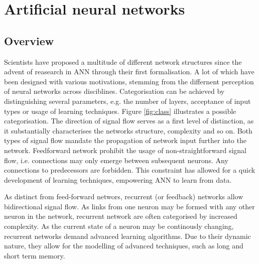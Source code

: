 \documentclass[10pt,a4paper,DIV=11]{scrreprt}
\begin{document}
\chapter{Artificial neural networks}
\section{Overview}

Scientists have proposed a multitude of different network structures since the advent of reasearch in ANN through their first formalisation. A lot of which have been designed with various motivations, stemming from the differnent perception of neural networks across disciblines. Categorisation can be achieved by distinguishing several parameters, e.g. the number of layers, acceptance of input types or usage of learning techniques. Figure \ref{fig:class} illustrates a possible categorisation\cite{NNGER}. The direction of signal flow serves as a first level of distinction, as it substantially characterises the networks structure, complexity and so on. Both types of signal flow mandate the propagation of network input further into the network. Feedforward network prohibit the usage of non-straightforward signal flow, i.e. connections may only emerge between subsequent neurons. Any connections to predecessors are forbidden. This constraint has allowed for a quick development of learning techniques, empowering ANN to learn from data. 

As distinct from feed-forward networs, recurrent (or feedback) networks allow bidirectional signal flow. As links from one neuron may be formed with any other neuron in the network, recurrent network are often categorised by increased complexity. As the current state of a neuron may be continously changing, recurrent networks demand advanced learning algorithms. Due to their dynamic nature, they allow for the modelling of advanced techniques, such as long and short term memory.
\end{document}
